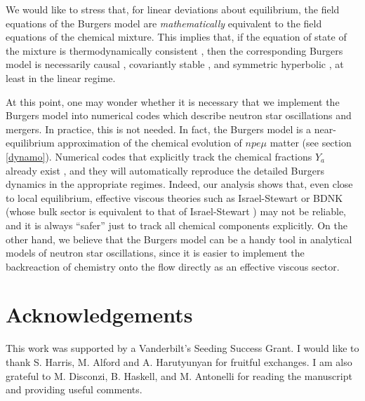 \documentclass[a4paper, amsfonts, amssymb, amsmath, reprint, showkeys, nofootinbib, twoside, onecolumn,notitlepage]{revtex4-1}
\begin{document}
We would like to stress that, for linear deviations about equilibrium, the field equations of the Burgers model are \textit{mathematically} equivalent to the field equations of the chemical mixture. This implies that, if the equation of state of the mixture is thermodynamically consistent \cite{landau5,GavassinoLyapunov_2020,
GavassinoStabilityCarter2022,
GavassinoGENERIC2022}, then the corresponding Burgers model is necessarily causal \cite{GavassinoCausality2021}, covariantly stable \cite{GavassinoGibbs2021,GavassinoSuperluminal2021,GavassinoBounds2023}, and symmetric hyperbolic \cite{GavassinoCasmir2022}, at least in the linear regime. 


At this point, one may wonder whether it is necessary that we implement the Burgers model into numerical codes which describe neutron star oscillations and mergers. In practice, this is not needed. In fact, the Burgers model is a near-equilibrium approximation of the chemical evolution of $npe\mu$ matter (see section \ref{dynamo}). Numerical codes that explicitly track the chemical fractions $Y_a$ already exist \cite{Perego19,RadiceEjecta2,MostHaber2022}, and they will automatically reproduce the detailed Burgers dynamics in the appropriate regimes. Indeed, our analysis shows that, even close to local equilibrium, effective viscous theories such as Israel-Stewart \cite{Hishcock1983} or BDNK \cite{BemficaDNDefinitivo2020} (whose bulk sector is equivalent to that of Israel-Stewart \cite{DoreGavassino2022}) may not be reliable, and it is always ``safer'' just to track all chemical components explicitly. On the other hand, we believe that the Burgers model can be a handy tool in analytical models of  neutron star oscillations, since it is easier to implement the backreaction of chemistry onto the flow directly as an effective viscous sector. 





\section*{Acknowledgements}

This work was supported by a Vanderbilt's Seeding Success Grant. I would like to thank S. Harris, M. Alford and A. Harutyunyan for fruitful exchanges. I am also grateful to M. Disconzi, B. Haskell, and M. Antonelli for reading the manuscript and providing useful comments. 


\appendix
\end{document}
